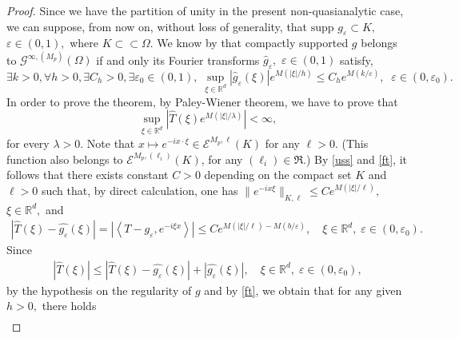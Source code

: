 \documentclass[sn-mathphys,Numbered]{sn-jnl}%
\theoremstyle{thmstyleone}%
\theoremstyle{thmstyletwo}%
\theoremstyle{thmstylethree}%
\begin{document}
\begin{proof}  

Since we have the partition of unity in the present non-quasianalytic case,   we can suppose, from now on,  without loss of generality, that 
$\mbox{supp } g_\varepsilon\subset K,$ $\varepsilon\in(0,1),$ where $K\subset\subset \Omega$.  We know by \cite{D.V.1} that compactly supported $g$ belongs 
to  $\mathcal G^{\infty,(M_p)}(\Omega)$ if and only its Fourier transforms $\hat{g}_{\varepsilon},$ $\varepsilon\in (0,1)$ satisfy,
\begin{equation}\label{ft}
\exists k>0, \forall h>0, \exists C_h >0,  \exists \varepsilon_0\in(0,1), \;\sup_{\xi\in\mathbb R^d} |\hat{g}_{\varepsilon}(\xi)|e^{M({|\xi|}/{h})} \leq C_h e^{M({k}/{\varepsilon})}, \;\; \varepsilon\in(0,\varepsilon_0).
\end{equation}  
In order to prove the theorem, by Paley-Wiener theorem, we  have to prove that 
\begin{equation*}
\sup_{\xi\in\mathbb R^d} \left|\hat{T}(\xi)e^{M({|\xi|}/{\lambda})}\right| <\infty,
\end{equation*}
for every $\lambda >0$. Note that $x\mapsto e^{-ix\cdot \xi}\in\mathcal E^{M_p,\ell}(K)$ for any $\ell>0.$  (This function also belongs to  $\mathcal E^{M_p,(\ell_i)}(K)$, for any $(\ell_i)\in\mathfrak R$.) By \eqref{uss} and \eqref{ft}, it follows that there exists constant $C>0$ depending on the compact set $K$ and $\ell>0$ such that,  by direct calculation, one has $\|e^{-ix\xi}\|_{K,\ell}\leq Ce^{M(|\xi|/\ell)}, $ $\xi\in \mathbb R^d,$ and
\begin{align*}
\left|\hat{T}(\xi)- \hat{g_{\varepsilon}}(\xi)\right| = \left|\left\langle T-g_{\varepsilon},e^{-i\xi x}\right\rangle\right| \leq Ce^{{M}(|\xi|/{\ell})-{M}(b/{\varepsilon})},\quad \xi\in\mathbb R^d,\; \varepsilon\in(0,\varepsilon_0).
\end{align*}
Since
\begin{align*}
\left|\hat{T}(\xi)\right| \leq \left|\hat{T}(\xi)- \hat{g_{\varepsilon}}(\xi)\right| +\left|\hat{g_{\varepsilon}}(\xi)\right|,\quad \xi\in\mathbb R^d, \;\varepsilon\in(0,\varepsilon_0),
\end{align*}
by the hypothesis on the regularity of $g$ and by \eqref{ft},  we obtain that  for any given $h>0,$ there holds
\begin{align*}

\end{align*}
\end{proof}
\end{document}
